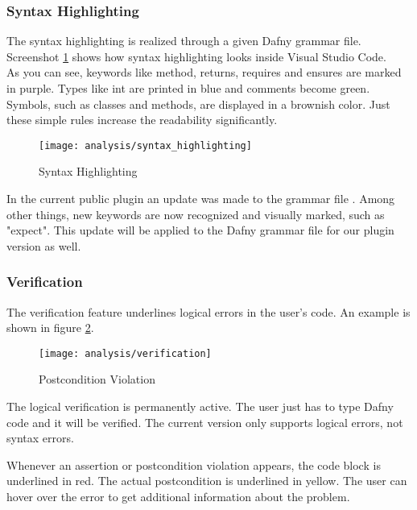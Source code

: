 \subsubsection{Syntax Highlighting}
The syntax highlighting is realized through a given Dafny grammar file.
Screenshot \ref{fig:analysis_syntax_highlighting} shows how syntax highlighting looks inside Visual Studio Code. \\

As you can see, keywords like method, returns, requires and ensures are marked in purple. Types like int are printed in blue and comments become green. Symbols, such as classes and methods, are displayed in a brownish color. Just these simple rules increase the readability significantly.

\begin{figure}[H]
    \centering
    \texttt{[image: analysis/syntax\_highlighting]}
    \caption{Syntax Highlighting}
    \label{fig:analysis_syntax_highlighting}
\end{figure}

In the current public plugin an update was made to the grammar file \cite{syntax_update}.
Among other things, new keywords are now recognized and visually marked, such as "expect".
This update will be applied to the Dafny grammar file for our plugin version as well.

\subsubsection{Verification}
The verification feature underlines logical errors in the user's code. An example is shown in figure \ref{fig:analysis_verification}.

\begin{figure}[H]
    \centering
    \texttt{[image: analysis/verification]}
    \caption{Postcondition Violation}
    \label{fig:analysis_verification}
\end{figure}

The logical verification is permanently active. The user just has to type Dafny code and it will be verified. The current version only supports logical errors, not syntax errors.

Whenever an assertion or postcondition violation appears, the code block is underlined in red. The actual postcondition is underlined in yellow. The user can hover over the error to get additional information about the problem. \\

